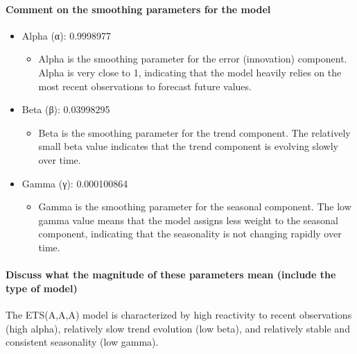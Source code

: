 \documentclass[
]{article}
\providecommand{\tightlist}{%
  \setlength{\itemsep}{0pt}\setlength{\parskip}{0pt}}
\begin{document}
\hypertarget{comment-on-the-smoothing-parameters-for-the-model}{%
\paragraph{Comment on the smoothing parameters for the
model}\label{comment-on-the-smoothing-parameters-for-the-model}}

\begin{itemize}
\item
  Alpha (α): 0.9998977

  \begin{itemize}
  \tightlist
  \item
    Alpha is the smoothing parameter for the error (innovation)
    component. Alpha is very close to 1, indicating that the model
    heavily relies on the most recent observations to forecast future
    values.
  \end{itemize}
\item
  Beta (β): 0.03998295

  \begin{itemize}
  \tightlist
  \item
    Beta is the smoothing parameter for the trend component. The
    relatively small beta value indicates that the trend component is
    evolving slowly over time.
  \end{itemize}
\item
  Gamma (γ): 0.000100864

  \begin{itemize}
  \tightlist
  \item
    Gamma is the smoothing parameter for the seasonal component. The low
    gamma value means that the model assigns less weight to the seasonal
    component, indicating that the seasonality is not changing rapidly
    over time.
  \end{itemize}
\end{itemize}

\hypertarget{discuss-what-the-magnitude-of-these-parameters-mean-include-the-type-of-model}{%
\paragraph{Discuss what the magnitude of these parameters mean (include
the type of
model)}\label{discuss-what-the-magnitude-of-these-parameters-mean-include-the-type-of-model}}

The ETS(A,A,A) model is characterized by high reactivity to recent
observations (high alpha), relatively slow trend evolution (low beta),
and relatively stable and consistent seasonality (low gamma).
\end{document}
